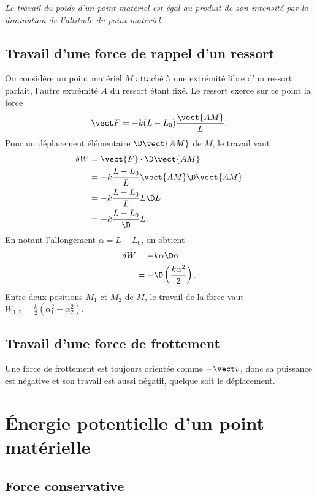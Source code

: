 \emph{Le travail du poids d'un point matériel est égal au produit de son intensité par la diminution de l'altitude du point matériel.}

\subsection{Travail d'une force de rappel d'un ressort}
\label{chap4-subsec:travailduneforcederappel}

On considère un point matériel $M$ attaché à une extrémité libre d'un ressort parfait, l'autre extrémité $A$ du ressort étant fixé. Le ressort exerce sur ce point la force
\begin{equation}
  \vF = -k(L-L_0)\frac{\vect{AM}}{L}.
\end{equation}
Pour un déplacement élémentaire $\D \vect{AM}$ de $M$, le travail vaut
\begin{align}
  \delta W &= \vect{F} \cdot \D \vect{AM} \\
  &= -k \frac{L-L_0}{L} \vect{AM} \D \vect{AM} \\
  &= -k \frac{L-L_0}{L} L \D L \\
  &= -k \frac{L-L_0} \D L.
\end{align}
En notant l'allongement $\alpha = L-L_0$, on obtient
\begin{align}
  \delta W &= -k\alpha \D \alpha\\
  &=-\D \left(\frac{k\alpha^2}{2}\right).
\end{align}
Entre deux positions $M_1$ et $M_2$ de $M$, le travail de la force vaut $W_{1,2}=\frac{k}{2}(\alpha_1^2-\alpha_2^2)$.

\subsection{Travail d'une force de frottement}
\label{chap4-subsec:travaildufrottement}

Une force de frottement est toujours orientée comme $-\vv$, donc sa puissance est négative et son travail est aussi négatif, quelque soit le déplacement.

\section{Énergie potentielle d'un point matérielle}
\label{chap4-sec:energiepotentielle}

\subsection{Force conservative}
\label{chap4-subsec:forceconservative}

